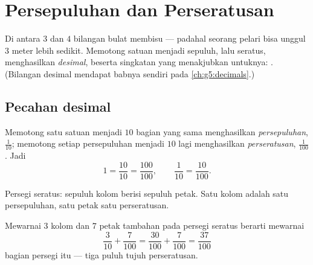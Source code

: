 \chapter{Persepuluhan dan Perseratusan}\label{ch:g4:decimals}

Di antara $3$ dan $4$ bilangan bulat membisu --- padahal seorang
pelari bisa unggul $3$ meter lebih sedikit. Memotong satuan menjadi
sepuluh, lalu seratus, menghasilkan \emph{ desimal}, beserta
singkatan yang menakjubkan untuknya: . (Bilangan
desimal mendapat babnya sendiri pada \cref{ch:g5:decimals}.)

\section{Pecahan desimal}

\begin{definition}\label{def:g4:decimals:def}
Memotong satu satuan menjadi $10$ bagian yang sama menghasilkan
\emph{persepuluhan}, $\frac{1}{10}$; memotong setiap persepuluhan
menjadi $10$ lagi menghasilkan \emph{perseratusan}, $\frac{1}{100}$.
Jadi
\[
1 = \frac{10}{10} = \frac{100}{100},
\qquad
\frac{1}{10} = \frac{10}{100}.
\]
\end{definition}

\begin{omfigure}

{\small Persegi seratus: sepuluh kolom berisi sepuluh petak. Satu
kolom adalah satu persepuluhan, satu petak satu perseratusan.}
\end{omfigure}

\begin{example}\label{ex:g4:decimals:count}
Mewarnai $3$ kolom dan $7$ petak tambahan pada persegi seratus berarti mewarnai
\[
\frac{3}{10} + \frac{7}{100} = \frac{30}{100} + \frac{7}{100}
= \frac{37}{100}
\]
bagian persegi itu --- tiga puluh tujuh perseratusan.
\end{example}

